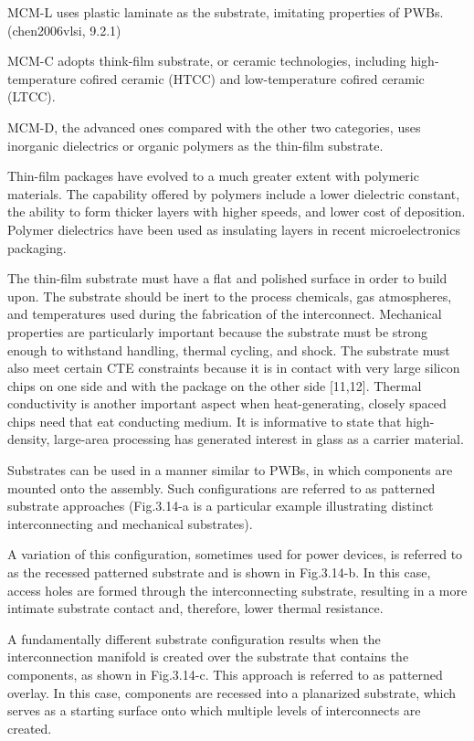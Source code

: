 \begin{spacing}{1.5}
MCM-L uses plastic laminate as the substrate, imitating properties of PWBs. (chen2006vlsi, 9.2.1)

MCM-C adopts think-film substrate, or ceramic technologies, including high-temperature cofired ceramic (HTCC) and low-temperature cofired ceramic (LTCC). %

MCM-D, the advanced ones compared with the other two categories, uses inorganic dielectrics or organic polymers as the thin-film substrate. 

Thin-film packages have evolved to a much greater extent with polymeric materials. The capability offered by polymers include a lower dielectric constant, the ability to form thicker layers with higher speeds, and lower cost of deposition. Polymer dielectrics have been used as insulating layers in recent microelectronics packaging.

The thin-film substrate must have a flat and polished surface in order to build upon. The substrate should be inert to the process chemicals, gas atmospheres, and temperatures used during the fabrication of the interconnect. Mechanical properties are particularly important because the substrate must be strong enough to withstand handling, thermal cycling, and shock. The substrate must also meet certain CTE constraints because it is in contact with very large silicon chips on one side and with the package on the other side [11,12]. Thermal conductivity is another important aspect when heat-generating, closely spaced chips need that  eat conducting medium. It is informative to state that high-density, large-area processing has generated interest in glass as a carrier material. 

Substrates can be used in a manner similar to PWBs, in which components are mounted onto the assembly. Such configurations are referred to as patterned substrate approaches (Fig.3.14-a is a particular example illustrating distinct interconnecting and mechanical substrates).

A variation of this configuration, sometimes used for power devices, is referred to as the recessed patterned substrate and is shown in Fig.3.14-b. In this case, access holes are formed through the interconnecting substrate, resulting in a more intimate substrate contact and, therefore, lower thermal resistance.

A fundamentally different substrate configuration results when the interconnection manifold is created over the substrate that contains the components, as shown in Fig.3.14-c. This approach is referred to as patterned overlay. In this case, components are recessed into a planarized substrate, which serves as a starting surface onto which multiple levels of interconnects are created. 


\end{spacing}
